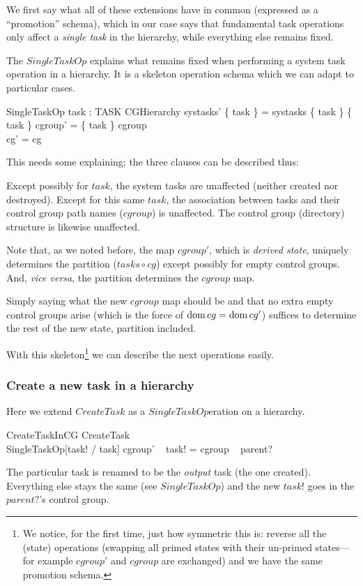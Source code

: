 \documentclass[a4paper,twoside,12pt]{article}
\begin{document}
We first say what all of these extensions have in common (expressed as a ``promotion'' schema),
which in our case says that fundamental task operations only affect a \emph{single task} in the hierarchy, while
everything else remains fixed.

The $SingleTaskOp$ explains what remains fixed when performing a system task operation in a hierarchy.
It is a skeleton operation schema which we can adapt to particular cases.

\begin{schema}{SingleTaskOp}
task : TASK
\also
\Delta CGHierarchy
\where
systasks' \setminus \{ task \} = systasks \setminus \{ task \}
\also
\{ task \} \ndres cgroup' = \{ task \} \ndres cgroup \\
\dom cg' = \dom cg
\end{schema}
This needs some explaining; the three clauses can be described thus:

Except possibly for $task$, the system tasks are unaffected (neither created nor destroyed).
Except for this same $task$, the association between tasks and their control group path names ($cgroup$) is unaffected.
The control group (directory) structure is likewise unaffected.

Note that, as we noted before, the map $cgroup'$, which is \emph{derived state},
uniquely determines the partition ($tasks \circ cg$) except possibly for
empty control groups. And, \emph{vice versa}, the partition determines the $cgroup$ map.

Simply saying what the new $cgroup$ map should be and that no extra empty control groups arise
(which is the force of $\mathop{\mathrm{dom}} cg = \mathop{\mathrm{dom}} cg'$)
suffices to determine the rest of the new state, partition included.

With this skeleton\footnote{We notice, for the first time, just how symmetric this is:
reverse all the (state) operations (swapping all primed states with their un-primed states---for
example $cgroup'$ and $cgroup$ are exchanged) and we have the same promotion schema.}
we can describe the next operations easily.

\subsubsection{Create a new task in a hierarchy}

Here we extend $CreateTask$ as a $SingleTaskOp$eration on a hierarchy.

\begin{schema}{CreateTaskInCG}
CreateTask \\
SingleTaskOp[task! / task]
\where
cgroup' ~ task! = cgroup ~ parent?
\end{schema}
The particular task is renamed to be the \emph{output} task (the one created).
Everything else stays the same (see $SingleTaskOp$) and the new $task!$ goes in the $parent?$'s control group.
\end{document}
